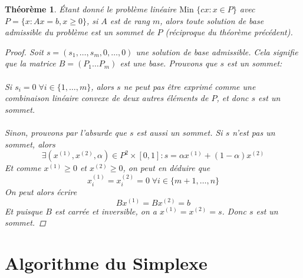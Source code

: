\documentclass[a4paper]{report}
\theoremstyle{definition}
\theoremstyle{remark}
\theoremstyle{plain}
\newtheorem{theorem}{Théorème}
\begin{document}
\begin{theorem}
Étant donné le problème linéaire \(\text{Min }\{cx:x\in P\}\) avec
\(P = \{x:Ax=b,x\ge 0\}\), si \(A\) est de rang \(m\), alors toute solution de
base admissible du problème est un sommet de \(P\) (réciproque du théorème
précédent).
\begin{proof}
Soit \(s=(s_1,\dots,s_m,0,\dots,0)\) une solution de base admissible. Cela
signifie que la matrice \(B=(P_1\dots P_m)\) est une base. Prouvons que \(s\)
est un sommet:
\paragraph{}
Si \(s_i=0\;\forall i\in\{1,\dots,m\}\), alors \(s\) ne peut pas être exprimé comme une
combinaison linéaire convexe de deux autres éléments de \(P\), et donc \(s\) est
un sommet.
\paragraph{}
Sinon, prouvons par l'absurde que \(s\) est aussi un sommet. Si \(s\) n'est pas
un sommet, alors
\[\exists (x^{(1)},x^{(2)},\alpha)\in P^2\times[0,1]:s=\alpha x^{(1)}+(1-\alpha)x^{(2)}\]
Et comme \(x^{(1)}\ge0\) et \(x^{(2)}\ge0\), on peut en déduire que
\[x^{(1)}_i=x^{(2)}_i=0\;\forall i\in\{m+1,\dots,n\}\]
On peut alors écrire
\[Bx^{(1)}=Bx^{(2)}=b\]
Et puisque \(B\) est carrée et inversible, on a \(x^{(1)}=x^{(2)}=s\).
Donc \(s\) est un sommet.
\end{proof}
\end{theorem}

\section{Algorithme du Simplexe}
\end{document}
